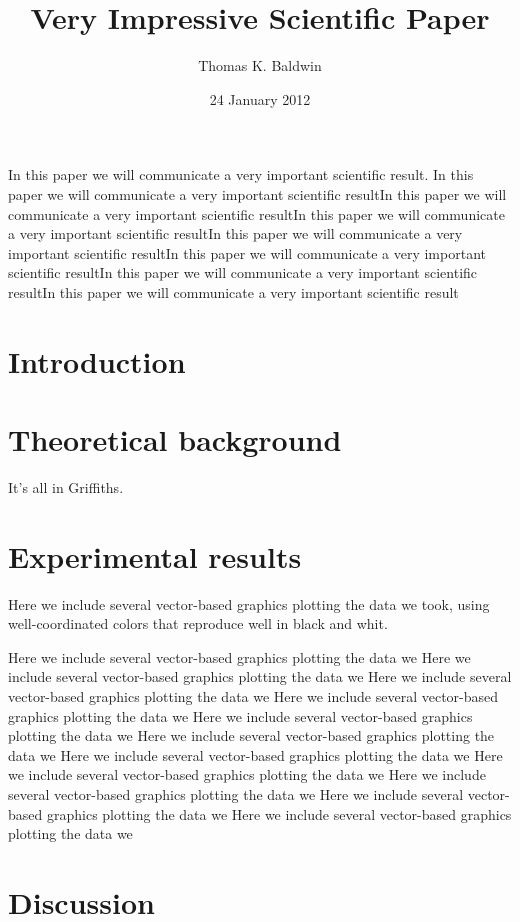 \documentclass[11pt]{amsart}
\title{Very Impressive Scientific Paper}
\author{Thomas K. Baldwin}
\date{24 January 2012}
\begin{document}
\maketitle

In this paper we will communicate a very important scientific result.
In this paper we will communicate a very important scientific resultIn this paper we will communicate a very important scientific resultIn this paper we will communicate a very important scientific resultIn this paper we will communicate a very important scientific resultIn this paper we will communicate a very important scientific resultIn this paper we will communicate a very important scientific resultIn this paper we will communicate a very important scientific result
\section{Introduction}

\section{Theoretical background}

It's all in Griffiths.

\section{Experimental results}

Here we include several vector-based graphics plotting the data we
took, using well-coordinated colors that reproduce well in black and
whit.

Here we include several vector-based graphics plotting the data we
Here we include several vector-based graphics plotting the data we
Here we include several vector-based graphics plotting the data we
Here we include several vector-based graphics plotting the data we
Here we include several vector-based graphics plotting the data we
Here we include several vector-based graphics plotting the data we
Here we include several vector-based graphics plotting the data we
Here we include several vector-based graphics plotting the data we
Here we include several vector-based graphics plotting the data we
Here we include several vector-based graphics plotting the data we
Here we include several vector-based graphics plotting the data we


\section{Discussion}
\end{document}
